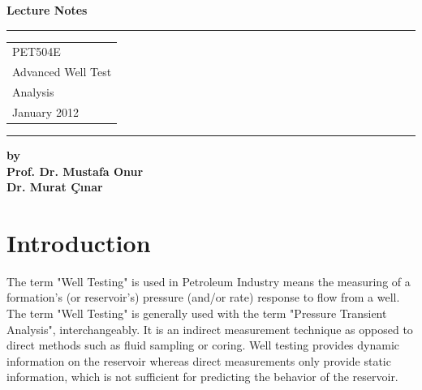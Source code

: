 \documentclass{llncs}
\numberwithin{equation}{section}
\numberwithin{figure}{section}
\numberwithin{table}{section}
\begin{document}
    \thispagestyle{empty}
    \begin{flushleft}
        \LARGE\bfseries Lecture Notes\\[1cm]
    \end{flushleft}
    \rule{\textwidth}{1pt}
    \vspace{2pt}
    \begin{flushright}
        \Huge
            \begin{tabular}{@{}l}
                PET504E \\
                Advanced Well Test \\
                Analysis\\[6pt]
                {\Large January 2012}
            \end{tabular}
        \end{flushright}
    \rule{\textwidth}{1pt}

    \begin{flushleft}
        \LARGE\bfseries by\\ Prof. Dr. Mustafa Onur \\[0.5cm]
        Dr. Murat \c{C}{\i}nar\\

    \end{flushleft}
    \vfill

    \section{Introduction}
%
    The term "Well Testing"  is used in Petroleum Industry means the measuring of a formation's
    (or reservoir's) pressure (and/or rate) response to flow from a well. The term "Well Testing"
    is generally used with the term "Pressure Transient Analysis", interchangeably. It is an indirect
    measurement technique as opposed to direct methods such as fluid sampling or coring. Well testing
    provides dynamic information on the reservoir whereas direct measurements only provide static
    information, which is not sufficient for predicting the behavior of the reservoir.\\
\end{document}
